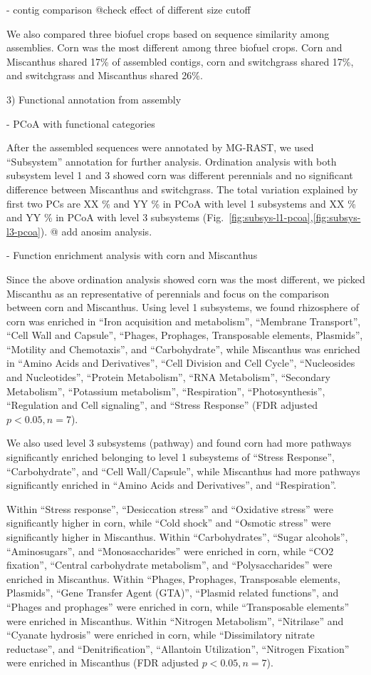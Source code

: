 \documentclass[12pt]{article}
\begin{document}
- contig comparison @check effect of different size cutoff

We also compared three biofuel crops based on sequence similarity among assemblies. Corn was the most different among three biofuel crops. Corn and Miscanthus shared 17\% of assembled contigs, corn and switchgrass shared 17\%, and switchgrass and Miscanthus shared 26\%.

3) Functional annotation from assembly

- PCoA with functional categories

After the assembled sequences were annotated by MG-RAST, we used ``Subsystem'' annotation for further analysis. Ordination analysis with both subsystem level 1 and 3 showed corn was different perennials and no significant difference between Miscanthus and switchgrass. The total variation explained by first two PCs are XX \% and YY \% in PCoA with level 1 subsystems and XX \% and YY \% in PCoA with level 3 subsystems (Fig.~\ref{fig:subsys-l1-pcoa},\ref{fig:subsys-l3-pcoa}). @ add anosim analysis.

- Function enrichment analysis with corn and Miscanthus

Since the above ordination analysis showed corn was the most different, we picked Miscanthu as an representative of perennials and focus on the comparison between corn and Miscanthus. Using level 1 subsystems, we found rhizosphere of corn was enriched in ``Iron acquisition and metabolism'', ``Membrane Transport'', ``Cell Wall and Capsule'', ``Phages, Prophages, Transposable elements, Plasmids'', ``Motility and Chemotaxis'', and ``Carbohydrate'', while Miscanthus was enriched in ``Amino Acids and Derivatives'', ``Cell Division and Cell Cycle'', ``Nucleosides and Nucleotides'', ``Protein Metabolism'', ``RNA Metabolism'', ``Secondary Metabolism'', ``Potassium metabolism'', ``Respiration'', ``Photosynthesis'', ``Regulation and Cell signaling'', and ``Stress Response'' (FDR adjusted $p < 0.05, n = 7$).

We also used level 3 subsystems (pathway) and found corn had more pathways significantly enriched belonging to level 1 subsystems of ``Stress Response'', ``Carbohydrate'', and ``Cell Wall/Capsule'', while Miscanthus had more pathways significantly enriched in ``Amino Acids and Derivatives'', and ``Respiration''.

Within ``Stress response'', ``Desiccation stress'' and  ``Oxidative stress'' were significantly higher in corn, while ``Cold shock'' and ``Osmotic stress'' were significantly higher in Miscanthus. Within ``Carbohydrates'', ``Sugar alcohols'', ``Aminosugars'', and ``Monosaccharides'' were enriched in corn, while ``CO2 fixation'', ``Central carbohydrate metabolism'', and ``Polysaccharides'' were enriched in Miscanthus. Within ``Phages, Prophages, Transposable elements, Plasmids'', ``Gene Transfer Agent (GTA)'', ``Plasmid related functions'', and ``Phages and prophages'' were enriched in corn, while ``Transposable elements'' were enriched in Miscanthus. Within ``Nitrogen Metabolism'', ``Nitrilase'' and ``Cyanate hydrosis'' were enriched in corn, while ``Dissimilatory nitrate reductase'', and ``Denitrification'', ``Allantoin Utilization'', ``Nitrogen Fixation''  were enriched in Miscanthus (FDR adjusted $p < 0.05, n = 7$).
\end{document}
